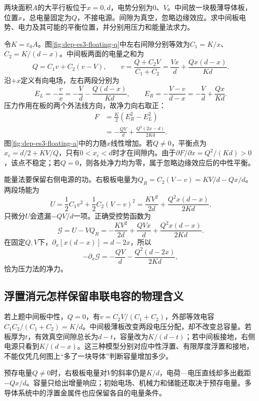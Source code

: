 \begin{example}[带电浮置板的电势与失稳]
两块面积$A$的大平行板位于$x=0,d$，电势分别为0、$V$。中间放一块极薄导体板，位置$x$，总电量固定为$Q$，不接电源。间隙为真空，忽略边缘效应。求中间板电势、电力及其可能的平衡位置，并分别用压力和能量法求力。
\end{example}
\begin{solution}
令$K=\varepsilon_0A$。图\ref{fig:dep-es3-floating-q}中左右间隙分别等效为$C_1=K/x$、$C_2=K/(d-x)$。中间板两面的电量之和为
\[
 Q=C_1v+C_2(v-V),\qquad
 v=\frac{Q+C_2V}{C_1+C_2}
 =\frac{Vx}{d}+\frac{Qx(d-x)}{Kd}.
\]
沿$+x$定义有向电场，左右两段分别为
\[
 E_L=-\frac vx=-\frac Vd-\frac{Q(d-x)}{Kd},\qquad
 E_R=-\frac{V-v}{d-x}=-\frac Vd+\frac{Qx}{Kd}.
\]
压力作用在板的两个外法线方向，故净力向右取正：
\begin{align*}
 F&=\frac K2(E_R^2-E_L^2)\\
 &=-\frac{QV}{d}+\frac{Q^2(2x-d)}{2Kd}.
\end{align*}
图\ref{fig:dep-es3-floating-a}中的力随$x$线性增加。若$Q\ne0$，平衡点为$x_e=d/2+KV/Q$，只有$0<x_e<d$时才在间隙内。由于$\partial F/\partial x=Q^2/(Kd)>0$，该点不稳定；若$Q=0$，则各处净力均为零，属于忽略边缘效应后的中性平衡。

能量法要保留右侧电源的功。右极板电量为$Q_R=C_2(V-v)=KV/d-Qx/d$。两段场能为
\[
 U=\frac12C_1v^2+\frac12C_2(V-v)^2
 =\frac{KV^2}{2d}+\frac{Q^2x(d-x)}{2Kd}.
\]
只微分$U$会遗漏$-QV/d$一项。正确受控势函数为
\[
 \mathcal G=U-VQ_R=-\frac{KV^2}{2d}
 +\frac{QVx}{d}+\frac{Q^2x(d-x)}{2Kd}.
\]
在固定$Q,V$下，$\partial_x[x(d-x)]=d-2x$，所以
\[-\partial_x\mathcal G=-\frac{QV}{d}-\frac{Q^2(d-2x)}{2Kd},\]
恰为压力法的净力。
\end{solution}

\subsection{浮置消元怎样保留串联电容的物理含义}
若上题中间板中性，$Q=0$，有$v=C_2V/(C_1+C_2)$，外部等效电容$C_1C_2/(C_1+C_2)=K/d$。中间极薄板改变两段电压分配，却不改变总容量。若板厚为$t$，有效真空间隙总长为$d-t$，容量改为$K/(d-t)$；若中间板接地，右侧电源只看到$K/(d-x)$。这三种模型分别对应中性浮置、有限厚度浮置和接地，不能仅凭几何图上“多了一块导体”判断容量增加多少。

预存电量$Q\ne0$时，右极板电量对$V$的斜率仍是$K/d$，电荷—电压直线却多出截距$-Qx/d$。容量只给出增量响应；初始电场、机械力和储能还取决于预存电量。多导体系统中的浮置金属件也应保留各自的电量条件。
